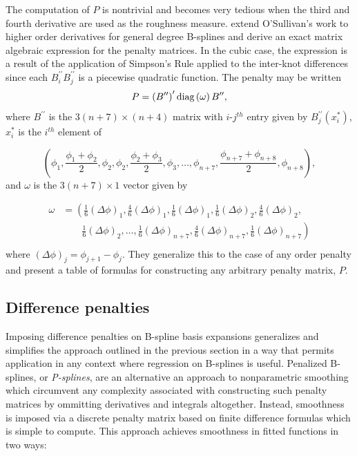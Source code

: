 \documentclass[12pt]{article}
\begin{document}
The computation of $P$ is nontrivial and becomes very tedious when the third and fourth derivative are used as the roughness measure. \cite{wand2008semiparametric} extend O'Sullivan's work to higher order derivatives for general degree B-splines and derive an exact matrix algebraic expression for the penalty matrices. In the cubic case, the expression is a result of the application of Simpson's Rule applied to the inter-knot differences since each $B_i^{\prime \prime} B_j^{\prime \prime}$ is a piecewise quadratic function. The penalty may be written
 \[
 P = \left(B^{\prime \prime}\right)^\prime \textup{diag}\left(\omega \right) B^{\prime \prime}, 
 \]
 \noindent
 where $B^{\prime \prime}$ is the $3\left( n + 7 \right) \times \left( n + 4 \right)$ matrix with $i$-$j^{th}$ entry given by $B_j^{\prime \prime} \left(x_i^*\right)$, $x^*_i$ is the $i^{th}$ element of 
 
\[
\left( \phi_1,\frac{\phi_1+\phi_2}{2},\phi_2,\phi_2,\frac{\phi_2+\phi_3}{2},\phi_3,\dots,\phi_{n+7},\frac{\phi_{n+7}+\phi_{n+8}}{2},\phi_{n+8} \right),
\]
 \noindent
 and $\omega$ is the $3\left(n+7\right) \times 1$ vector given by
 
\begin{align*}
\omega &= \left( \frac{1}{6}\left(\Delta \phi \right)_1,\frac{4}{6}\left(\Delta \phi \right)_1, \frac{1}{6}\left(\Delta \phi \right)_1,\frac{1}{6}\left(\Delta \phi \right)_2, \frac{4}{6}\left(\Delta \phi \right)_2,  \right. \\
&\qquad   \left. {} \frac{1}{6}\left(\Delta \phi \right)_2 , \dots , \frac{1}{6}\left(\Delta \phi \right)_{n+7}, \frac{4}{6}\left(\Delta \phi \right)_{n+7}, \frac{1}{6}\left(\Delta \phi \right)_{n+7}  \right) \\
\end{align*}
\noindent
 where $\left(\Delta \phi \right)_j = \phi_{j+1}-\phi_j$. They generalize this to the case of any order penalty and present a table of formulas for constructing any arbitrary penalty matrix, $P$.
 
 
 \subsection{Difference penalties}
 
Imposing difference penalties on B-spline basis expansions generalizes and simplifies the approach outlined in the previous section in a way that permits application in any context where regression on B-splines is useful. Penalized B-splines, or \emph{P-splines}, are an alternative an approach to nonparametric smoothing which circumvent any complexity associated with constructing such penalty matrices by ommitting derivatives and integrals altogether. Instead, smoothness is imposed via a discrete penalty matrix based on finite difference formulas which is simple to compute. This approach achieves smoothness in fitted functions in two ways:
\end{document}
